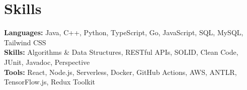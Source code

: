 \documentclass[11pt]{article}       %
\begin{document}
\vspace{-18.5pt}


\section*{Skills}
\textbf{Languages:} Java, C++, Python, TypeScript, Go, JavaScript, SQL, MySQL, Tailwind CSS\\
\textbf{Skills:} Algorithms \& Data Structures, RESTful APIs, SOLID, Clean Code, JUnit, Javadoc, Perspective\\
\textbf{Tools:} React, Node.js, Serverless, Docker, GitHub Actions, AWS, ANTLR, TensorFlow.js, Redux Toolkit\\

\vspace{-6.5pt}
\end{document}
